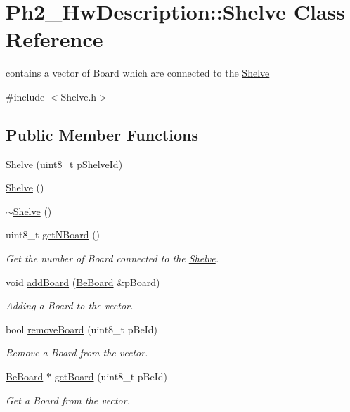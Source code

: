 \hypertarget{class_ph2___hw_description_1_1_shelve}{\section{Ph2\-\_\-\-Hw\-Description\-:\-:Shelve Class Reference}
\label{class_ph2___hw_description_1_1_shelve}
}


contains a vector of Board which are connected to the \hyperlink{class_ph2___hw_description_1_1_shelve}{Shelve}  




{\ttfamily \#include $<$Shelve.\-h$>$}

\subsection*{Public Member Functions}
\begin{DoxyCompactItemize}
\item 
\hyperlink{class_ph2___hw_description_1_1_shelve_a7e0361665ca7e4de8ce3fd1138ad1d86}{Shelve} (uint8\-\_\-t p\-Shelve\-Id)
\item 
\hyperlink{class_ph2___hw_description_1_1_shelve_ab989c28364f9f94029dd02b3eb1d8241}{Shelve} ()
\item 
\hyperlink{class_ph2___hw_description_1_1_shelve_acbdc580d3ff8f4efe2df84d19ef6ef55}{$\sim$\-Shelve} ()
\item 
uint8\-\_\-t \hyperlink{class_ph2___hw_description_1_1_shelve_a9d8f1abe782fb206e11aae187cbc44c2}{get\-N\-Board} ()
\begin{DoxyCompactList}\small\item\em Get the number of Board connected to the \hyperlink{class_ph2___hw_description_1_1_shelve}{Shelve}. \end{DoxyCompactList}\item 
void \hyperlink{class_ph2___hw_description_1_1_shelve_aa6ab700f126822c6da156760f130aba6}{add\-Board} (\hyperlink{class_ph2___hw_description_1_1_be_board}{Be\-Board} \&p\-Board)
\begin{DoxyCompactList}\small\item\em Adding a Board to the vector. \end{DoxyCompactList}\item 
bool \hyperlink{class_ph2___hw_description_1_1_shelve_ad0d5bb55bdf8e6629cdc919685ffb8f9}{remove\-Board} (uint8\-\_\-t p\-Be\-Id)
\begin{DoxyCompactList}\small\item\em Remove a Board from the vector. \end{DoxyCompactList}\item 
\hyperlink{class_ph2___hw_description_1_1_be_board}{Be\-Board} $\ast$ \hyperlink{class_ph2___hw_description_1_1_shelve_a4b3d05cdf618b323e37fffdc3872476e}{get\-Board} (uint8\-\_\-t p\-Be\-Id)
\begin{DoxyCompactList}\small\item\em Get a Board from the vector. \end{DoxyCompactList}\end{DoxyCompactItemize}
